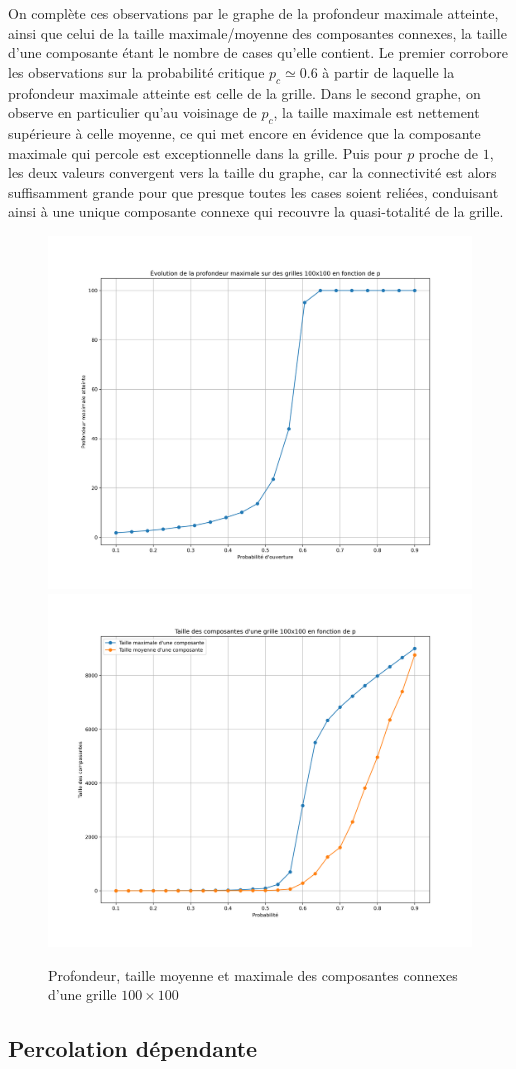 \documentclass[11pt,a4paper]{article}
\begin{document}
On complète ces observations par le graphe de la profondeur maximale atteinte, ainsi que celui de la taille maximale/moyenne des composantes connexes, la taille d'une composante étant le nombre de cases qu'elle contient. Le premier corrobore les observations sur la probabilité critique $p_c \simeq 0.6$ à partir de laquelle la profondeur maximale atteinte est celle de la grille. Dans le second graphe, on observe en particulier qu'au voisinage de $p_c$, la taille maximale est nettement supérieure à celle moyenne, ce qui met encore en évidence que la composante maximale qui percole est exceptionnelle dans la grille. Puis pour $p$ proche de $1$, les deux valeurs convergent vers la taille du graphe, car la connectivité est alors suffisamment grande pour que presque toutes les cases soient reliées, conduisant ainsi à une unique composante connexe qui recouvre la quasi-totalité de la grille.


\begin{figure}[H]

\centering
\includegraphics[width=.5\textwidth]{./Pictures/profondeur.png}\hfill
\includegraphics[width=.5\textwidth]{./Pictures/taille.png}

\caption{Profondeur, taille moyenne et maximale des composantes connexes d'une grille $100\times 100$}
\label{fig:depth_size}

\end{figure}


\subsection{Percolation dépendante}
\end{document}
